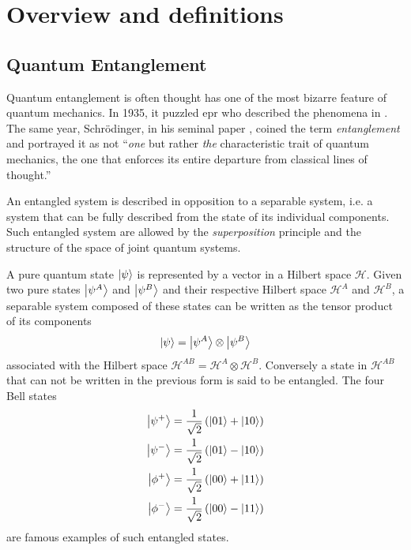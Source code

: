 \part{Overview and definitions}

\chapter{Quantum Entanglement}
\label{section:entanglement}

Quantum entanglement is often thought has one of the most bizarre feature of quantum mechanics. 
In 1935, it puzzled \acrfull{epr} who described the phenomena in \cite{Einstein35}. 
The same year, Schrödinger, in his seminal paper \cite{Schrödinger35},
coined the term \textit{entanglement} and portrayed it as not \enquote{\textit{one} but rather \textit{the} characteristic trait of quantum mechanics, the one that enforces its entire departure from classical lines of thought.}

An entangled system is described in opposition to a separable system, i.e. a system that can be fully described from the state of its individual components. 
Such entangled system are allowed by the \textit{superposition} principle and the structure of the space of joint quantum systems. 

A pure quantum state $\ket{\psi}$ is represented by a vector in a Hilbert space $\mathscr{H}$.
Given two pure states $\ket{\psi^A}$ and $\ket{\psi^B}$ and their respective Hilbert space $\mathscr{H}^A$ and $\mathscr{H}^B$, a separable system composed of these states can be written as the tensor product of its components
\begin{equation}
	\ket{\psi} = \ket{\psi^A} \otimes \ket{\psi^B}
	\label{eq:separable_state}
\end{equation}
associated with the Hilbert space $\mathscr{H}^{AB}=\mathscr{H}^A\otimes\mathscr{H}^B$. 
Conversely a state in $\mathscr{H}^{AB}$ that can not be written in the previous form is said to be entangled.
The four Bell states 
\begin{align}
	\ket{\psi^+} &= \frac{1}{\sqrt{2}}\left(\ket{01}+\ket{10}\right) \\
	\ket{\psi^-} &= \frac{1}{\sqrt{2}}\left(\ket{01}-\ket{10}\right) \\
	\ket{\phi^+} &= \frac{1}{\sqrt{2}}\left(\ket{00}+\ket{11}\right) \\
	\ket{\phi^-} &= \frac{1}{\sqrt{2}}\left(\ket{00}-\ket{11}\right)
	\label{eq:bell_states}
\end{align}
are famous examples of such entangled states.

